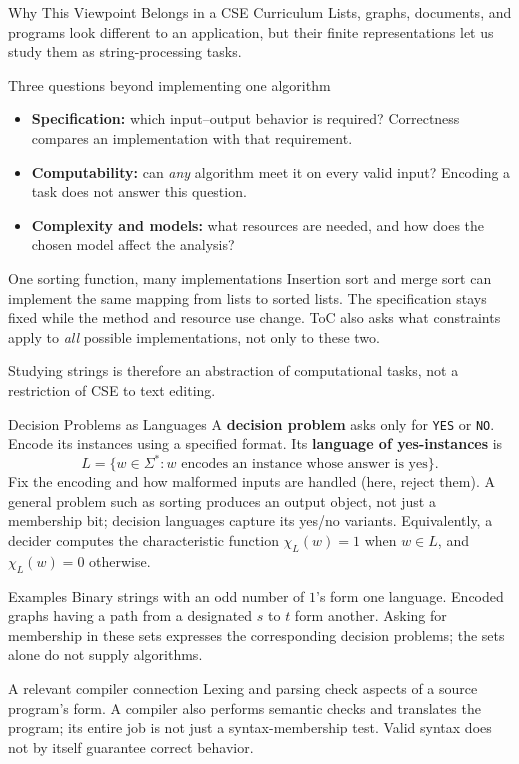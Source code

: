 \documentclass[10pt]{beamer}
\begin{document}
\begin{frame}{Why This Viewpoint Belongs in a CSE Curriculum}
  \small
  Lists, graphs, documents, and programs look different to an application,
  but their finite representations let us study them as string-processing tasks.
  \begin{block}{Three questions beyond implementing one algorithm}
    \begin{itemize}
      \item \textbf{Specification:} which input--output behavior is required?
        Correctness compares an implementation with that requirement.
      \pause
      \item \textbf{Computability:} can \emph{any} algorithm meet it on every
        valid input? Encoding a task does not answer this question.
      \pause
      \item \textbf{Complexity and models:} what resources are needed, and
        how does the chosen model affect the analysis?
    \end{itemize}
  \end{block}
  \pause
  \begin{exampleblock}{One sorting function, many implementations}
    Insertion sort and merge sort can implement the same mapping from lists
    to sorted lists. The specification stays fixed while the method and
    resource use change. ToC also asks what constraints apply to \emph{all}
    possible implementations, not only to these two.
  \end{exampleblock}
  Studying strings is therefore an abstraction of computational tasks,
  not a restriction of CSE to text editing.
\end{frame}

\begin{frame}{Decision Problems as Languages}
  \small
  A \textbf{decision problem} asks only for \texttt{YES} or \texttt{NO}.
  Encode its instances using a specified format. Its
  \textbf{language of yes-instances} is
  \[
    L=\{w\in\Sigma^*:w\text{ encodes an instance whose answer is yes}\}.
  \]
  Fix the encoding and how malformed inputs are handled (here, reject them).
  A general problem such as sorting produces an output object, not just
  a membership bit; decision languages capture its yes/no variants.
  Equivalently, a decider computes the characteristic function
  $\chi_L(w)=1$ when $w\in L$, and $\chi_L(w)=0$ otherwise.
  \pause
  \begin{exampleblock}{Examples}
    Binary strings with an odd number of $1$'s form one language.
    Encoded graphs having a path from a designated $s$ to $t$ form another.
    Asking for membership in these sets expresses the corresponding
    decision problems; the sets alone do not supply algorithms.
  \end{exampleblock}
  \pause
  \begin{block}{A relevant compiler connection}
    Lexing and parsing check aspects of a source program's form. A compiler
    also performs semantic checks and translates the program; its entire
    job is not just a syntax-membership test. Valid syntax does not by itself
    guarantee correct behavior.
  \end{block}
\end{frame}
\end{document}
